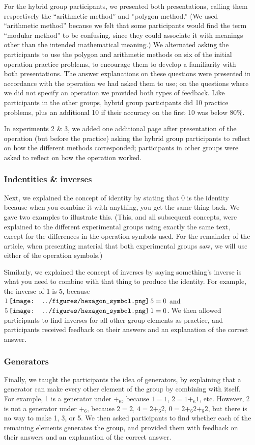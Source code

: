 \documentclass[man,10pt]{apa6}
\newcommand{\hex}{\,\vcenter{\hbox{\texttt{[image: ../figures/hexagon\_symbol.png]}}}\,}
\begin{document}
For the hybrid group participants, we presented both presentations, calling them respectively the ``arithmetic method'' and ''polygon method.'' (We used ``arithmetic method'' because we felt that some participants would find the term ``modular method'' to be confusing, since they could associate it with meanings other than the intended mathematical meaning.) We alternated asking the participants to use the polygon and arithmetic methods on six of the initial operation practice problems, to encourage them to develop a familiarity with both presentations. The answer explanations on these questions were presented in accordance with the operation we had asked them to use; on the questions where we did not specify an operation we provided both types of feedback. Like participants in the other groups, hybrid group participants did 10 practice problems, plus an additional 10 if their accuracy on the first 10 was below 80\%.\par
In experiments 2 \& 3, we added one additional page after presentation of the operation (but before the practice) asking the hybrid group participants to reflect on how the different methods corresponded; participants in other groups were asked to reflect on how the operation worked. 
\subsubsection{Indentities \& inverses}
Next, we explained the concept of identity by stating that 0 is the identity because when you combine it with anything, you get the same thing back. We gave two examples to illustrate this. (This, and all subsequent concepts, were explained to the different experimental groups using exactly the same text, except for the differences in the operation symbols used. For the remainder of the article, when presenting material that both experimental groups saw, we will use either of the operation symbols.)\par
Similarly, we explained the concept of inverses by saying something's inverse is what you need to combine with that thing to produce the identity. For example, the inverse of 1 is 5, because $1 \hex 5 = 0$ and $5 \hex 1 = 0$. We then allowed participants to find inverses for all other group elements as practice, and participants received feedback on their answers and an explanation of the correct answer.
\subsubsection{Generators}
Finally, we taught the participants the idea of generators, by explaining that a generator can make every other element of the group by combining with itself. For example, 1 is a generator under $+_6$, because $1 = 1$, $2 = 1 +_6 1$, etc. However, 2 is not a generator under $+_6$, because $2 = 2$, $4 = 2 +_6 2$, $0 = 2 +_6 2 +_6 2$, but there is no way to make 1, 3, or 5. We then asked participants to find whether each of the remaining elements generates the group, and provided them with feedback on their answers and an explanation of the correct answer.
\end{document}
